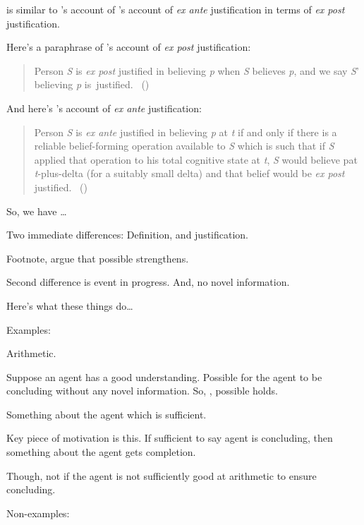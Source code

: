 \begin{note}
  \supportII{} is similar to \citeauthor{Goldman:1979ui}'s account of \citeauthor{Goldman:1979ui}'s account of \emph{ex ante} justification in terms of \emph{ex post} justification.

  Here's a paraphrase of \citeauthor{Goldman:1979ui}'s account of \emph{ex post} justification:
  \begin{quote}
    Person \emph{S} is \emph{ex post} justified in believing \emph{p} when \emph{S} believes \emph{p}, and we say \emph{S}' believing \emph{p} is~justified.%
    \mbox{ }\hfill\mbox{(\citeyear[Cf.][21]{Goldman:1979ui})}
  \end{quote}
  And here's \citeauthor{Goldman:1979ui}'s account of \emph{ex ante} justification:
  \begin{quote}
    Person \emph{S} is \emph{ex ante} justified in believing \emph{p} at \emph{t} if and only if there is a reliable belief-forming operation available to \emph{S} which is such that if \emph{S} applied that operation to his total cognitive state at \emph{t}, \emph{S} would believe pat \emph{t}-plus-delta (for a suitably small delta) and that belief would be \emph{ex post} justified.%
    \mbox{ }\hfill\mbox{(\citeyear[21]{Goldman:1979ui})}
  \end{quote}
  So, we have \dots

  Two immediate differences: Definition, and justification.

  Footnote, argue that possible strengthens.
  

  Second difference is event in progress.
  And, no novel information.

  Here's what these things do\dots
\end{note}


\begin{note}
  Examples:

  Arithmetic.

  Suppose an agent has a good understanding.
  Possible for the agent to be concluding without any novel information.
  So, \supportII{}, possible \ros{} holds.

  Something about the agent which is sufficient.

  Key piece of motivation is this.
  If sufficient to say agent is concluding, then something about the agent gets completion.

  Though, not if the agent is not sufficiently good at arithmetic to ensure concluding.

  
  

  Non-examples:

  
\end{note}

